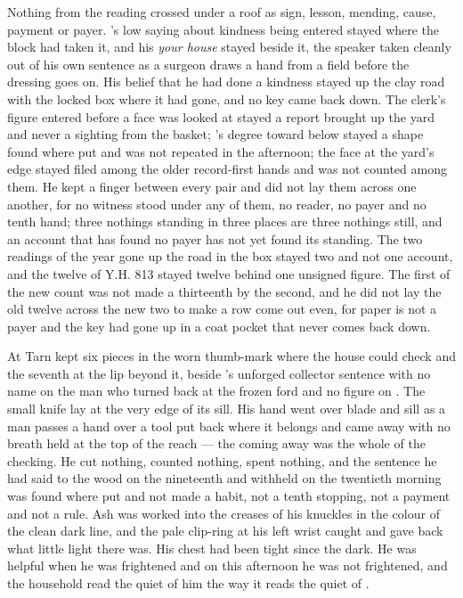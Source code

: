 Nothing from the reading crossed under a roof as sign, lesson, mending, cause, payment or payer. 's low saying about kindness being entered stayed where the block had taken it, and his \emph{your house} stayed beside it, the speaker taken cleanly out of his own sentence as a surgeon draws a hand from a field before the dressing goes on. His belief that he had done a kindness stayed up the clay road with the locked box where it had gone, and no key came back down. The clerk's figure entered before a face was looked at stayed a report brought up the yard and never a sighting from the basket; 's degree toward  below  stayed a shape found where put and was not repeated in the afternoon; the face at the yard's edge stayed filed among the older record-first hands and was not counted among them. He kept a finger between every pair and did not lay them across one another, for no witness stood under any of them, no reader, no payer and no tenth hand; three nothings standing in three places are three nothings still, and an account that has found no payer has not yet found its standing. The two readings of the year gone up the road in the box stayed two and not one account, and the twelve of Y.H. 813 stayed twelve behind one unsigned figure. The first of the new count was not made a thirteenth by the second, and he did not lay the old twelve across the new two to make a row come out even, for paper is not a payer and the key had gone up in a coat pocket that never comes back down.

At  Tarn kept six pieces in the worn thumb-mark where the house could check and the seventh at the lip beyond it, beside 's unforged collector sentence with no name on the man who turned back at the frozen ford and no figure on . The small knife lay at the very edge of its sill. His hand went over blade and sill as a man passes a hand over a tool put back where it belongs and came away with no breath held at the top of the reach --- the coming away was the whole of the checking. He cut nothing, counted nothing, spent nothing, and the sentence he had said to the wood on the nineteenth and withheld on the twentieth morning was found where put and not made a habit, not a tenth stopping, not a payment and not a rule. Ash was worked into the creases of his knuckles in the colour of the clean dark line, and the pale clip-ring at his left wrist caught and gave back what little light there was. His chest had been tight since the dark. He was helpful when he was frightened and on this afternoon he was not frightened, and the household read the quiet of him the way it reads the quiet of .

